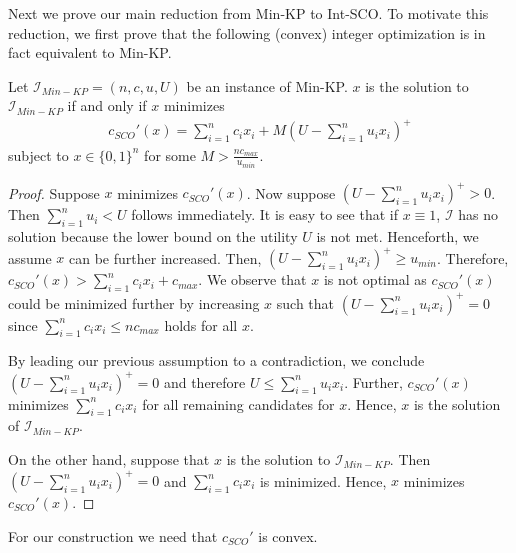 Next we prove our main reduction from Min-KP to Int-SCO. To motivate this reduction, we first prove that the following (convex) integer optimization is in fact equivalent to Min-KP.

\begin{lemma}
\label{lemma:integer_minimization}
Let $\mathcal{I}_{Min-KP} = (n, c, u, U)$ be an instance of Min-KP. $x$ is the solution to $\mathcal{I}_{Min-KP}$ if and only if $x$ minimizes \begin{align*}
    c_{SCO}'(x) = \sum_{i=1}^n c_i x_i + M\left(U - \sum_{i=1}^n u_i x_i\right)^+
\end{align*} subject to $x \in \{0,1\}^n$ for some $M > \frac{n c_{max}}{u_{min}}$.
\end{lemma}
\begin{proof}
Suppose $x$ minimizes $c_{SCO}'(x)$. Now suppose $(U - \sum_{i=1}^n u_i x_i)^+ > 0$. Then $\sum_{i=1}^n u_i < U$ follows immediately. It is easy to see that if $x \equiv 1$, $\mathcal{I}$ has no solution because the lower bound on the utility $U$ is not met. Henceforth, we assume $x$ can be further increased. Then, $(U - \sum_{i=1}^n u_i x_i)^+ \geq u_{min}$. Therefore, $c_{SCO}'(x) > \sum_{i=1}^n c_i x_i + c_{max}$. We observe that $x$ is not optimal as $c_{SCO}'(x)$ could be minimized further by increasing $x$ such that $(U - \sum_{i=1}^n u_i x_i)^+ = 0$ since $\sum_{i=1}^n c_i x_i \leq n c_{max}$ holds for all $x$.

By leading our previous assumption to a contradiction, we conclude $(U - \sum_{i=1}^n u_i x_i)^+ = 0$ and therefore $U \leq \sum_{i=1}^n u_i x_i$. Further, $c_{SCO}'(x)$ minimizes $\sum_{i=1}^n c_i x_i$ for all remaining candidates for $x$. Hence, $x$ is the solution of $\mathcal{I}_{Min-KP}$.

On the other hand, suppose that $x$ is the solution to $\mathcal{I}_{Min-KP}$. Then $(U - \sum_{i=1}^n u_i x_i)^+ = 0$ and $\sum_{i=1}^n c_i x_i$ is minimized. Hence, $x$ minimizes $c_{SCO}'(x)$.
\end{proof}

For our construction we need that $c_{SCO}'$ is convex.

